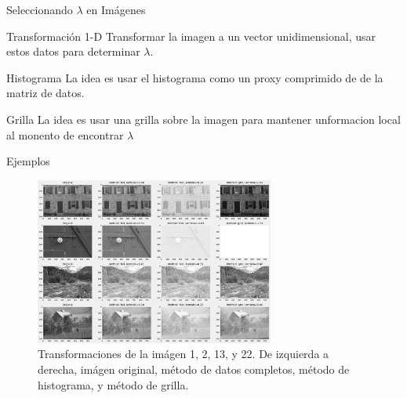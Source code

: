 \documentclass{beamer}
\begin{document}
\begin{frame}{Seleccionando $\lambda$ en Im\'agenes}
     
    \begin{block}{Transformación 1-D}
        Transformar la imagen a un vector unidimensional, usar estos datos para determinar $\lambda$.
    \end{block}
    
         
    \begin{block}{Histograma}
        La idea es usar el histograma como un proxy comprimido de de la matriz de datos. 
    \end{block}
    
         
    \begin{block}{Grilla}
        La idea es usar una grilla sobre la imagen para mantener unformacion local al monento de encontrar $\lambda$
    \end{block}

\end{frame}

\begin{frame}{Ejemplos}
    \begin{figure}[H]
        \centering
        \includegraphics[width=0.7\textwidth]{img_bci_all.png}
        \caption{Transformaciones de la im\'agen 1, 2, 13, y 22. De izquierda a derecha, im\'agen original, m\'etodo de datos completos, m\'etodo de histograma, y m\'etodo de grilla.}
        \label{fig:img_bci_all}
    \end{figure}
\end{frame}
\end{document}
